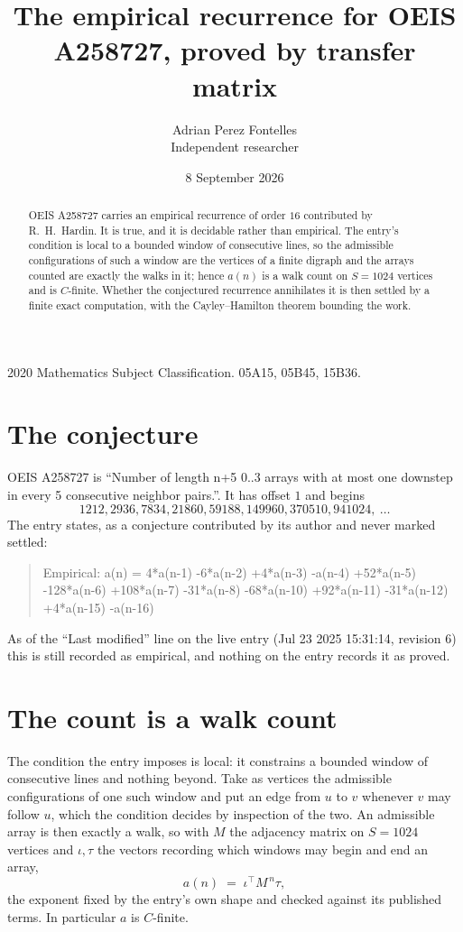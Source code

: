 \documentclass[11pt,a4paper]{article}
\title{The empirical recurrence for OEIS A258727, proved by transfer matrix}
\author{Adrian Perez Fontelles\\ \small Independent researcher}
\date{8 September 2026}
\theoremstyle{plain}
\theoremstyle{definition}
\begin{document}
\maketitle

\begin{abstract}
OEIS A258727 carries an empirical recurrence of order $16$ contributed by R.~H.~Hardin. It is
true, and it is decidable rather than empirical. The entry's condition is local to a bounded window of consecutive lines, so
the admissible configurations of such a window are the vertices of a finite digraph and the
arrays counted are exactly the walks in it; hence $a(n)$ is a walk count on $S=1024$ vertices
and is $C$-finite. Whether the conjectured recurrence annihilates it is then settled by a
finite exact computation, with the Cayley--Hamilton theorem bounding the work.
\end{abstract}

\noindent\small 2020 Mathematics Subject Classification. 05A15, 05B45, 15B36.\normalsize

\section{The conjecture}

OEIS A258727 is ``Number of length n+5 0..3 arrays with at most one downstep in every 5 consecutive neighbor pairs.''. It has offset $1$ and begins
\[
1212, 2936, 7834, 21860, 59188, 149960, 370510, 941024,\ \dots
\]
The entry states, as a conjecture contributed by its author and never marked settled:
\begin{quote}
Empirical: a(n) = 4*a(n-1) -6*a(n-2) +4*a(n-3) -a(n-4) +52*a(n-5) -128*a(n-6) +108*a(n-7) -31*a(n-8) -68*a(n-10) +92*a(n-11) -31*a(n-12) +4*a(n-15) -a(n-16)
\end{quote}
As of the ``Last modified'' line on the live entry (Jul 23 2025 15:31:14, revision 6) this is still
recorded as empirical, and nothing on the entry records it as proved.

\section{The count is a walk count}

The condition the entry imposes is local: it constrains a bounded window of consecutive lines and nothing beyond. Take as
vertices the admissible configurations of one such window and put an edge from $u$ to $v$
whenever $v$ may follow $u$, which the condition decides by inspection of the two. An
admissible array is then exactly a walk, so with $M$ the adjacency matrix on $S=1024$ vertices
and $\iota,\tau$ the vectors recording which windows may begin and end an array,
\[
a(n)\;=\;\iota^{\!\top}M^{\,n}\tau ,
\]
the exponent fixed by the entry's own shape and checked against its published terms. In
particular $a$ is $C$-finite.
\end{document}
